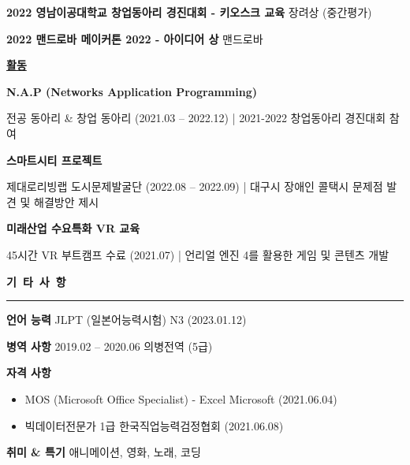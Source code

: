 \documentclass[a4paper, 10pt]{article}
\newcommand{\resumesection}[1]{%
  \vspace{8pt}
  \noindent
  {\large\bfseries #1}
  \vspace{2pt}
  \noindent\hrule
  \vspace{4pt}
}
\begin{document}
\vspace{1pt}
\noindent
\textbf{2022 \hfill 영남이공대학교 창업동아리 경진대회 - 키오스크 교육} \hfill 장려상 (중간평가)

\vspace{1pt}
\noindent
\textbf{2022 \hfill 맨드로바 메이커톤 2022 - 아이디어 상} \hfill 맨드로바

\vspace{4pt}
\noindent
\textbf{\underline{활동}}

\vspace{2pt}
\noindent
\textbf{N.A.P (Networks Application Programming)}

\noindent
{\small 전공 동아리 \& 창업 동아리 (2021.03 -- 2022.12) | 2021-2022 창업동아리 경진대회 참여}

\vspace{3pt}
\noindent
\textbf{스마트시티 프로젝트}

\noindent
{\small 제대로리빙랩 도시문제발굴단 (2022.08 -- 2022.09) | 대구시 장애인 콜택시 문제점 발견 및 해결방안 제시}

\vspace{3pt}
\noindent
\textbf{미래산업 수요특화 VR 교육}

\noindent
{\small 45시간 VR 부트캠프 수료 (2021.07) | 언리얼 엔진 4를 활용한 게임 및 콘텐츠 개발}


\resumesection{기\ 타\ 사\ 항}

\vspace{3pt}
\noindent
\textbf{언어 능력} \hfill JLPT (일본어능력시험) N3 (2023.01.12)

\vspace{2pt}
\noindent
\textbf{병역 사항} \hfill 2019.02 -- 2020.06 의병전역 (5급)

\vspace{2pt}
\noindent
\textbf{자격 사항}

\begin{itemize}
  \setlength{\itemsep}{1pt}
  \setlength{\parskip}{0pt}
  \item MOS (Microsoft Office Specialist) - Excel \hfill Microsoft (2021.06.04)
  \item 빅데이터전문가 1급 \hfill 한국직업능력검정협회 (2021.06.08)
\end{itemize}

\vspace{2pt}
\noindent
\textbf{취미 \& 특기} \hfill 애니메이션, 영화, 노래, 코딩
\end{document}
